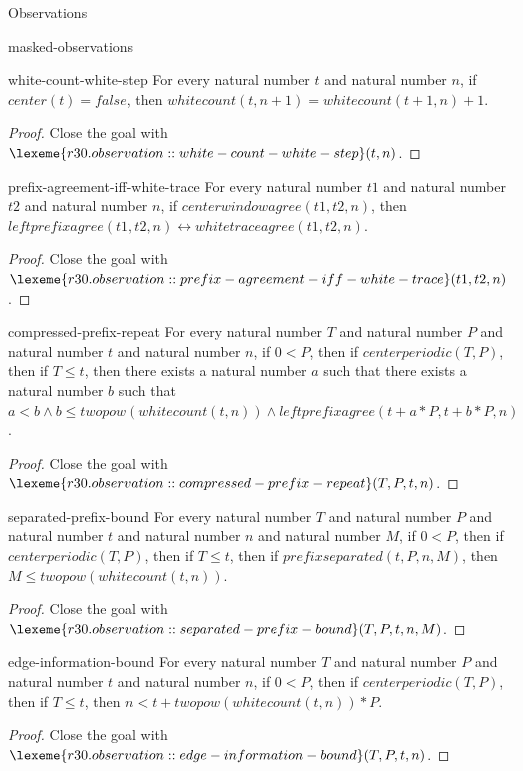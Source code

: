 \begin{lexlean}{Observations}
\begin{section}{masked-observations}
\begin{theorem}{white-count-white-step}
For every natural number \(t\) and natural number \(n\), if \(center(t) = false\), then \(whitecount(t, n + 1) = whitecount(t + 1, n) + 1\).
\begin{proof}
Close the goal with \(\lexeme{r30.observation::white-count-white-step}(t, n)\).
\end{proof}
\end{theorem}

\begin{theorem}{prefix-agreement-iff-white-trace}
For every natural number \(t1\) and natural number \(t2\) and natural number \(n\), if \(centerwindowagree(t1, t2, n)\), then \(leftprefixagree(t1, t2, n) ↔ whitetraceagree(t1, t2, n)\).
\begin{proof}
Close the goal with \(\lexeme{r30.observation::prefix-agreement-iff-white-trace}(t1, t2, n)\).
\end{proof}
\end{theorem}

\begin{theorem}{compressed-prefix-repeat}
For every natural number \(T\) and natural number \(P\) and natural number \(t\) and natural number \(n\), if \(0 < P\), then if \(centerperiodic(T, P)\), then if \(T ≤ t\), then there exists a natural number \(a\) such that there exists a natural number \(b\) such that \(a < b ∧ b ≤ twopow(whitecount(t, n)) ∧ leftprefixagree(t + a * P, t + b * P, n)\).
\begin{proof}
Close the goal with \(\lexeme{r30.observation::compressed-prefix-repeat}(T, P, t, n)\).
\end{proof}
\end{theorem}

\begin{theorem}{separated-prefix-bound}
For every natural number \(T\) and natural number \(P\) and natural number \(t\) and natural number \(n\) and natural number \(M\), if \(0 < P\), then if \(centerperiodic(T, P)\), then if \(T ≤ t\), then if \(prefixseparated(t, P, n, M)\), then \(M ≤ twopow(whitecount(t, n))\).
\begin{proof}
Close the goal with \(\lexeme{r30.observation::separated-prefix-bound}(T, P, t, n, M)\).
\end{proof}
\end{theorem}

\begin{theorem}{edge-information-bound}
For every natural number \(T\) and natural number \(P\) and natural number \(t\) and natural number \(n\), if \(0 < P\), then if \(centerperiodic(T, P)\), then if \(T ≤ t\), then \(n < t + twopow(whitecount(t, n)) * P\).
\begin{proof}
Close the goal with \(\lexeme{r30.observation::edge-information-bound}(T, P, t, n)\).
\end{proof}
\end{theorem}


\end{section}
\end{lexlean}
